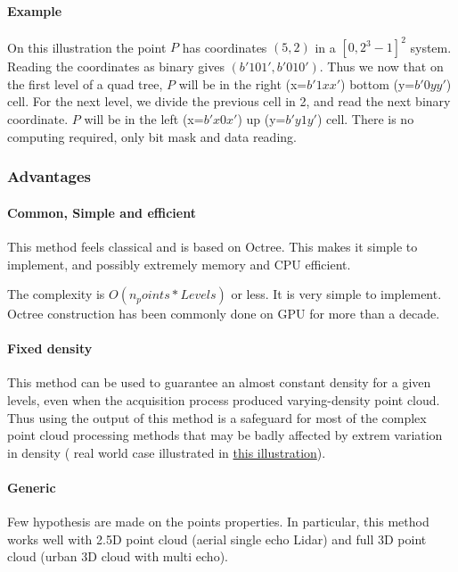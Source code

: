			\paragraph{Example} 
				 
				 On this illustration the point $P$ has coordinates $(5,2)$ in a $[0,2^3-1]^2$ system. Reading the coordinates as binary gives $(b'101',b'010')$.
				 Thus we now that on the first level of a quad tree, $P$ will be in the right (x=$b'1xx'$) bottom (y=$b'0yy'$) cell.
				 For the next level, we divide the previous cell in 2, and read the next binary coordinate. $P$ will be in the left (x=$b'x0x'$) up (y=$b'y1y'$) cell. There is no computing required, only bit mask and data reading.
			
		\subsubsection{Advantages}	
		
			\paragraph{Common, Simple and efficient}
				This method feels classical and is based on Octree. This makes it simple to implement, and possibly extremely memory and CPU efficient.

				The complexity is $O(n_points*Levels)$ or less. It is very simple to implement.				
				Octree construction has been commonly done on GPU for more than a decade.
				
			\paragraph{Fixed density}
				This method can be used to guarantee an almost constant density for a given levels, even when the acquisition process produced varying-density point cloud.
				Thus using the output of this method is a safeguard for most of the complex point cloud processing methods that may be badly affected by extrem variation in density ( real world case illustrated in \href{fig:density-variation}{this illustration}).
			\paragraph{Generic}
				Few hypothesis are made on the points properties. In particular, this method works well with 2.5D point cloud (aerial single echo Lidar) and full 3D point cloud (urban 3D cloud with multi echo).
